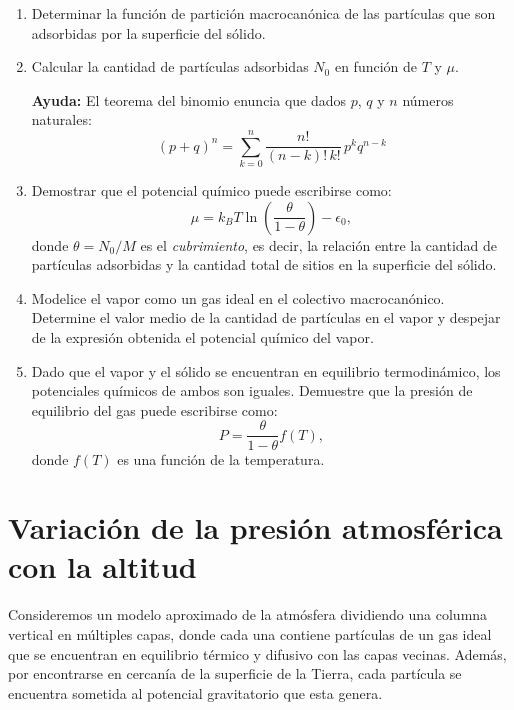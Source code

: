 \documentclass[a4paper,11pt]{article}
\begin{document}
\begin{enumerate}[label=(\alph*),
                  leftmargin=2\parindent,
                  rightmargin=2\parindent]

    \item{Determinar la función de partición macrocanónica de las 
          partículas que son adsorbidas por la superficie del sólido.}

    \item{Calcular la cantidad de partículas adsorbidas $N_0$ en función de 
          $T$ y $\mu$.}
          
    {\small
    \textbf{Ayuda:}
    El teorema del binomio enuncia que dados $p$, $q$ y $n$ números 
    naturales:
    $$ (p + q)^n = \sum_{k=0}^n \frac{n!}{(n-k)! \, k!} \, p^k q^{n-k} $$
    }
    
    \item{Demostrar que el potencial químico puede escribirse 
          como:
          $$ \mu = k_B T \ln(\frac{\theta}{1 - \theta}) - \epsilon_0, $$
          donde $\theta = N_0/M$ es el \emph{cubrimiento}, es decir, la 
          relación entre la cantidad de partículas adsorbidas y la cantidad 
          total de sitios en la superficie del sólido.
          }
    
    \item{Modelice el vapor como un gas ideal en el colectivo macrocanónico.
          Determine el valor medio de la cantidad de partículas en el vapor y 
          despejar de la expresión obtenida el potencial químico del vapor.
          }
    
    \item{Dado que el vapor y el sólido se encuentran en equilibrio 
          termodinámico, los potenciales químicos de ambos son iguales. 
          Demuestre que la presión de equilibrio del gas puede escribirse 
          como:
          $$ P = \frac{\theta}{1 - \theta} f(T), $$
          donde $f(T)$ es una función de la temperatura.
          }

\end{enumerate}



\section{Variación de la presión atmosférica con la altitud}

Consideremos un modelo aproximado de la atmósfera dividiendo una 
columna vertical en múltiples capas, donde cada una contiene partículas 
de un gas ideal que se encuentran en equilibrio térmico y difusivo con 
las capas vecinas. Además, por encontrarse en cercanía de la superficie 
de la Tierra, cada partícula se encuentra sometida al potencial 
gravitatorio que esta genera.
\end{document}
